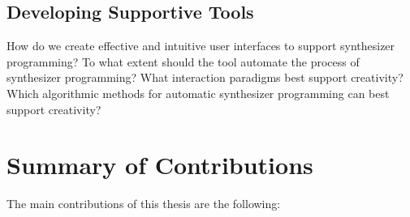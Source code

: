 \subsection{Developing Supportive Tools}
How do we create effective and intuitive user interfaces to support synthesizer programming? To what extent should the tool automate the process of synthesizer programming? What interaction paradigms best support creativity? Which algorithmic methods for automatic synthesizer programming can best support creativity?


%
%
%
%
%
%
%

\section{Summary of Contributions}
The main contributions of this thesis are the following:


